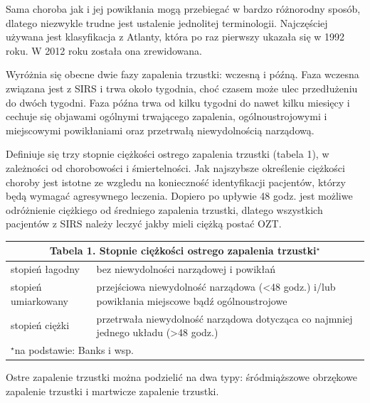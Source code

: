 \documentclass[a4paper, 12pt]{report}
\begin{document}
Sama choroba jak i jej powikłania mogą przebiegać w bardzo różnorodny
sposób, dlatego niezwykle trudne jest ustalenie jednolitej
terminologii. Najczęściej używana jest klasyfikacja z Atlanty, która
po raz pierwszy ukazała się w 1992 roku. W 2012 roku została ona
zrewidowana. 

Wyróżnia się obecne dwie fazy zapalenia trzustki: wczesną
i późną. Faza wczesna związana jest z SIRS i trwa około tygodnia, choć czasem może ulec
przedłużeniu do dwóch tygodni. Faza późna trwa od kilku tygodni do
nawet kilku miesięcy i cechuje się objawami ogólnymi trwającego
zapalenia, ogólnoustrojowymi i miejscowymi powikłaniami oraz
przetrwałą niewydolnością narządową. 

Definiuje się trzy stopnie ciężkości ostrego zapalenia
trzustki (tabela 1),  w zależności od chorobowości i śmiertelności. Jak
najszybsze określenie ciężkości choroby jest istotne ze wzgledu na
konieczność identyfikacji pacjentów, którzy będą wymagać agresywnego
leczenia. Dopiero po upływie 48 godz. jest możliwe odróżnienie
ciężkiego od średniego zapalenia trzustki, dlatego wszystkich
pacjentów z SIRS należy leczyć jakby mieli ciężką postać OZT.
\begin{table}[htbp]
\begin{center}
\begin{footnotesize}
\begin{tabular}{|p{4cm}|p{9cm}|}
\hline
\multicolumn{2}{|c|}{\cellcolor[gray]{0.9} \textbf{Tabela 1. Stopnie ciężkości ostrego zapalenia trzustki$^\star$}}\\
\hline \hline
stopień łagodny & bez niewydolności narządowej i powikłań\\ \hline
stopień umiarkowany & przejściowa niewydolność narządowa (<48
                           godz.) i/lub powikłania miejscowe bądź
                           ogólnoustrojowe\\ \hline
stopień ciężki & przetrwała niewydolność narządowa dotycząca
                       co najmniej jednego układu (>48 godz.)\\ \hline
\multicolumn{2}{|l|}{\scriptsize{$^\star$na podstawie: Banks i wsp.\cite{banks}}}\\
\hline
\end{tabular}
\end{footnotesize}
\end{center}
\end{table}

Ostre zapalenie trzustki można podzielić na dwa typy: śródmiąższowe
obrzękowe zapalenie trzustki i martwicze zapalenie trzustki. 
\end{document}
